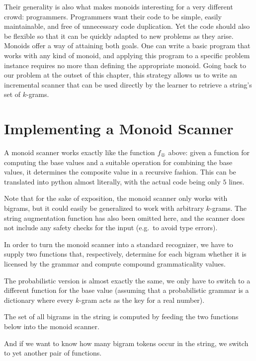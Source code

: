 Their generality is also what makes monoids interesting for a very different crowd: programmers.
Programmers want their code to be simple, easily maintainable, and free of unnecessary code duplication.
Yet the code should also be flexible so that it can be quickly adapted to new problems as they arise.
Monoids offer a way of attaining both goals.
One can write a basic program that works with any kind of monoid, and applying this program to a specific problem instance requires no more than defining the appropriate monoid.
Going back to our problem at the outset of this chapter, this strategy allows us to write an incremental scanner that can be used directly by the learner to retrieve a string's set of $k$-grams. 


\section{Implementing a Monoid Scanner}

A monoid scanner works exactly like the function $f_{\otimes}$ above: given a function for computing the base values and a suitable operation for combining the base values, it determines the composite value in a recursive fashion.
This can be translated into python almost literally, with the actual code being only $5$ lines.
%
\begin{center}
\end{center}
%
Note that for the sake of exposition, the monoid scanner only works with bigrams, but it could easily be generalized to work with arbitrary $k$-grams.
The string augmentation function has also been omitted here, and the scanner does not include any safety checks for the input (e.g.\ to avoid type errors).

In order to turn the monoid scanner into a standard recognizer, we have to supply two functions that, respectively, determine for each bigram whether it is licensed by the grammar and compute compound grammaticality values.
%
\begin{center}
\end{center}
%
The probabilistic version is almost exactly the same, we only have to switch to a different function for the base value (assuming that a probabilistic grammar is a dictionary where every $k$-gram acts as the key for a real number).
%
\begin{center}
\end{center}
%
The set of all bigrams in the string is computed by feeding the two functions below into the monoid scanner.
%
\begin{center}
\end{center}
%
And if we want to know how many bigram tokens occur in the string, we switch to yet another pair of functions.
%
\begin{center}
\end{center}


